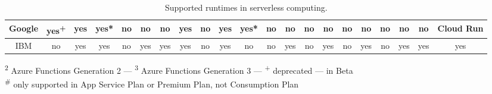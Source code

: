 \begin{table*}[!t]
{\begin{tabular}{l|l|c|c|c|c|c|c|c|c|c|c|c|c|c|c|c|c|c|c|c|c}
 \multicolumn{2}{|c|}{Google} & \cellcolor{green!25}yes\textsuperscript{+} & \cellcolor{green!25}yes & \cellcolor{green!25}yes* & \cellcolor{red!25}no & \cellcolor{red!25}no & \cellcolor{red!25}no & \cellcolor{green!25}yes & \cellcolor{red!25}no & \cellcolor{green!25}yes & \cellcolor{green!25}yes* & \cellcolor{red!25}no & \cellcolor{red!25}no & \cellcolor{red!25}no & \cellcolor{red!25}no & \cellcolor{red!25}no & \cellcolor{red!25}no & \cellcolor{red!25}no & \cellcolor{red!25}no & \cellcolor{red!25}no & \cellcolor{yellow!25}Cloud Run \\ \hline
 \multicolumn{2}{|c|}{IBM} & \cellcolor{red!25}no & \cellcolor{green!25}yes & \cellcolor{green!25}yes & \cellcolor{red!25}no & \cellcolor{green!25}yes & \cellcolor{green!25}yes & \cellcolor{green!25}yes & \cellcolor{red!25}no & \cellcolor{green!25}yes & \cellcolor{red!25}no & \cellcolor{red!25}no & \cellcolor{green!25}yes & \cellcolor{red!25}no & \cellcolor{green!25}yes & \cellcolor{red!25}no & \cellcolor{green!25}yes & \cellcolor{red!25}no & \cellcolor{green!25}yes & \cellcolor{green!25}yes & \cellcolor{green!25}yes \\ \hline
\end{tabular}}
\caption{Supported runtimes in serverless computing.}{\textsuperscript{2} Azure Functions Generation 2 \enspace --- \enspace \textsuperscript{3} Azure Functions Generation 3 \enspace --- \enspace \textsuperscript{+} deprecated \enspace --- \enspace * in Beta}\\{\textsuperscript{\#} only supported in App Service Plan or Premium Plan, not Consumption Plan}
\label{table:programming_languages}
\end{table*}